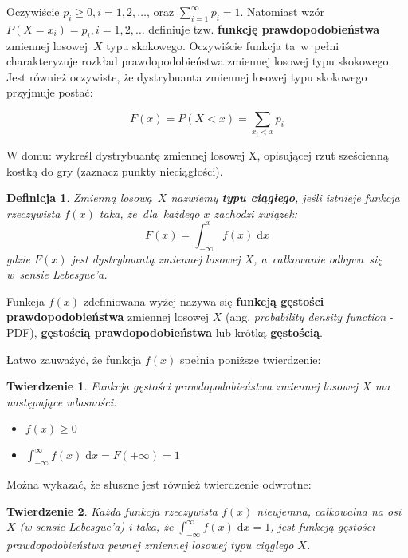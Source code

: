 \documentclass[10pt,a4paper]{article}
\newtheorem{definition}{Definicja}[section]
\newtheorem{theorem}{Twierdzenie}[section]
\newcommand{\dd}{\; \mathrm{d}}
\begin{document}
Oczywiście $p_i\geq0, i=1,2,\dotsc$, oraz $\sum_{i=1}^{\infty}p_i=1$. Natomiast
wzór $P(X=x_i)=p_i,i=1,2,\dotsc$ definiuje tzw. \textbf{funkcję
  prawdopodobieństwa} zmiennej losowej~$X$ typu skokowego. Oczywiście funkcja
ta~w~pełni charakteryzuje rozkład prawdopodobieństwa zmiennej losowej typu
skokowego. Jest również oczywiste, że dystrybuanta zmiennej losowej typu
skokowego przyjmuje postać:

\begin{equation}
  F(x) = P(X<x) = \sum_{x_i<x}p_i
\end{equation}

W domu: wykreśl dystrybuantę zmiennej losowej X, opisującej rzut sześcienną
kostką do gry (zaznacz punkty nieciągłości).

\begin{definition}
  Zmienną losową~$X$ nazwiemy \textbf{typu ciągłego}, jeśli istnieje funkcja
  rzeczywista $f(x)$ taka, że~dla~każdego $x$ zachodzi związek:
  \begin{equation}
    F(x)=\int_{-\infty}^{x}f(x)\dd{x}
  \end{equation}
  gdzie $F(x)$ jest dystrybuantą zmiennej losowej $X$, a~całkowanie odbywa~się
  w~sensie Lebesgue'a.
\end{definition}

Funkcja $f(x)$ zdefiniowana wyżej nazywa się \textbf{funkcją gęstości
prawdopodobieństwa} zmiennej losowej $X$ (ang. \textit{probability density
function} - PDF), \textbf{gęstością prawdopodobieństwa} lub krótką
\textbf{gęstością}.

Łatwo zauważyć, że funkcja $f(x)$ spełnia poniższe twierdzenie:

\begin{theorem}
  Funkcja gęstości prawdopodobieństwa zmiennej losowej $X$ ma następujące
  własności:
  \begin{itemize}
    \item $f(x) \geq 0$
    \item $\int_{-\infty}^\infty f(x)\dd{x} = F(+\infty) = 1$
  \end{itemize}
\end{theorem}

Można wykazać, że słuszne jest również twierdzenie odwrotne:

\begin{theorem}
  Każda funkcja rzeczywista $f(x)$ nieujemna, całkowalna na osi $X$ (w sensie
  Lebesgue'a) i taka, że $\int_{-\infty}^\infty f(x)\dd{x} = 1$, jest funkcją
  gęstości prawdopodobieństwa pewnej zmiennej losowej typu ciągłego $X$.
\end{theorem}
\end{document}
